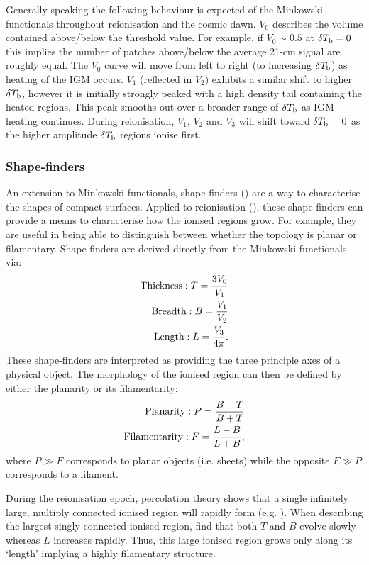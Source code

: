 Generally speaking the following behaviour is expected of the Minkowski functionals throughout reionisation and the cosmic dawn. $V_{0}$ describes the volume contained above/below the threshold value. For example, if $V_{0} \sim 0.5$ at $\delta T_{\rm b} = 0$ this implies the number of patches above/below the average 21-cm signal are roughly equal. The $V_{0}$ curve will move from left to right (to increasing $\delta T_{\rm b}$) as heating of the IGM occurs. $V_{1}$ (reflected in $V_{2}$) exhibits a similar shift to higher $\delta T_{\rm b}$, however it is initially strongly peaked with a high density tail containing the heated regions. This peak smooths out over a broader range of $\delta T_{\rm b}$ as IGM heating continues. During reionisation, $V_{1}$, $V_{2}$ and $V_{3}$ will shift toward $\delta T_{\rm b}=0$ as the higher amplitude $\delta T_{\rm b}$ regions ionise first.

\subsubsection{Shape-finders}

An extension to Minkowski functionals, shape-finders (\cite{Sahni:1998}) are a way to characterise the shapes of compact surfaces. Applied to reionisation (\cite{Bag:2018,Bag:2019}), these shape-finders can provide a means to characterise how the ionised regions grow. For example, they are useful in being able to distinguish between whether the topology is planar or filamentary. Shape-finders are derived directly from the Minkowski functionals via:
\begin{eqnarray}
{\rm Thickness}: T = \frac{3V_{0}}{V_{1}} \\
{\rm Breadth}: B = \frac{V_{1}}{V_{2}} \\
{\rm Length}: L =  \frac{V_{3}}{4\pi}.
\end{eqnarray}
These shape-finders are interpreted as providing the three principle axes of a physical object. The morphology of the ionised region can then be defined by either the planarity or its filamentarity:
\begin{eqnarray}
{\rm Planarity}: P = \frac{B - T}{B + T} \\
{\rm Filamentarity}: F = \frac{L - B}{L+B},
\end{eqnarray}
where $P\gg F$ corresponds to planar objects (i.e. sheets) while the opposite $F\gg P$ corresponds to a filament.

During the reionisation epoch, percolation theory shows that a single infinitely large, multiply connected ionised region will rapidly form (e.g. \cite{Furlanetto:2016}). When describing the largest singly connected ionised region, \cite{Bag:2018,Bag:2019} find that both $T$ and $B$ evolve slowly whereas $L$ increases rapidly. Thus, this large ionised region grows only along its `length' implying a highly filamentary structure.

